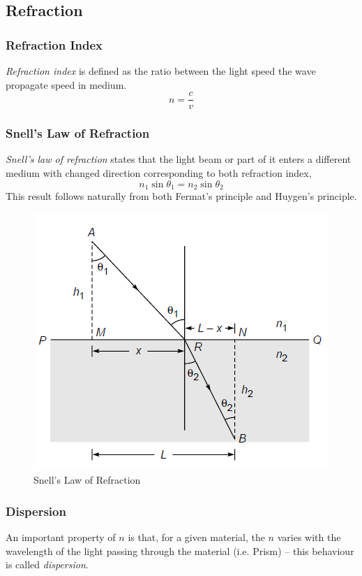 \documentclass[openany]{book}
\begin{document}
\subsection{Refraction}
\subsubsection{Refraction Index}
\emph{Refraction index} is defined as the ratio between the light speed the wave propagate speed in medium.
\[n=\frac{c}{v}\]
\subsubsection{Snell's Law of Refraction}
\emph{Snell's law of refraction} states that the light beam or part of it enters a different medium with changed direction corresponding to both refraction index,
\[n_1\sin \theta_1=n_2\sin \theta_2\]
This result follows naturally from both Fermat's principle and Huygen's principle.
\begin{figure}[H]
\centering
\label{fig:10}
\includegraphics[scale=1]{Figure/10.PNG}
\caption{Snell's Law of Refraction}
\end{figure}
\subsubsection{Dispersion}
An important property of $n$ is that, for a given material, the $n$ varies with the wavelength of the light passing through the material (i.e. Prism) – this behaviour is called \emph{dispersion}.
\end{document}
